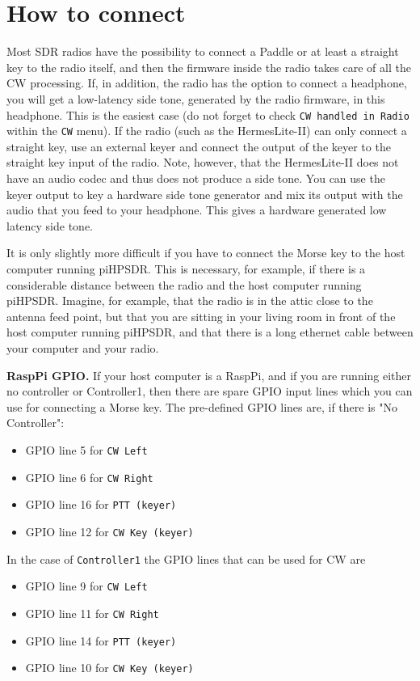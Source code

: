 \documentclass[12pt]{book}
\def\rett#1{\texttt{\color{red}#1}}
\def\bltt#1{\texttt{\color{blue}#1}}
\def\pH{pi\-HPSDR\xspace}
\begin{document}
\section{How to connect}
Most SDR radios have the possibility to connect a Paddle or at least a straight key to the
radio itself, and then the firmware inside the radio takes care of all the CW processing.
If, in addition, the radio has the option to  connect a headphone, you will get a low-latency
side tone, generated by the radio firmware, in this headphone.
This is the easiest case (do not forget to check \rett{CW handled in Radio} within the
\bltt{CW} menu). If the radio (such as the HermesLite-II) can only connect a straight key,
use an external keyer and connect the output of the keyer to the straight key input of the radio.
Note, however, that the HermesLite-II does not have an audio codec and thus does not produce a
side tone. You can use the keyer output to key a hardware side tone generator and mix its
output with the audio that you feed to your headphone. This gives a hardware generated low
latency side tone.

It is only slightly more difficult if you have to connect the Morse key to the host computer running
\pH. This is necessary, for example, if there is a considerable distance between the
radio and the host computer running \pH. Imagine, for example, that the radio is
in the attic close to the antenna feed point, but that you are sitting in your living room
in front of the host computer running \pH, and that there is a long ethernet cable
between your computer and your radio.

\textbf{RaspPi GPIO.} If your host computer is a RaspPi, and if you are running either no controller
or Controller1, then there are spare GPIO input lines which you can use for connecting a Morse
key. The pre-defined GPIO lines are, if there is "No Controller":

\begin{itemize}
\item{GPIO line 5 for \bltt{CW Left}}
\item{GPIO line 6 for \bltt{CW Right}}
\item{GPIO line 16 for \bltt{PTT (keyer)}}
\item{GPIO line 12 for \bltt{CW Key (keyer)}}
\end{itemize}

In the case of \texttt{Controller1} the GPIO lines that can be used for CW are

\begin{itemize}
\item{GPIO line 9 for \bltt{CW Left}}
\item{GPIO line 11 for \bltt{CW Right}}
\item{GPIO line 14 for \bltt{PTT (keyer)}}
\item{GPIO line 10 for \bltt{CW Key (keyer)}}
\end{itemize}
\end{document}
